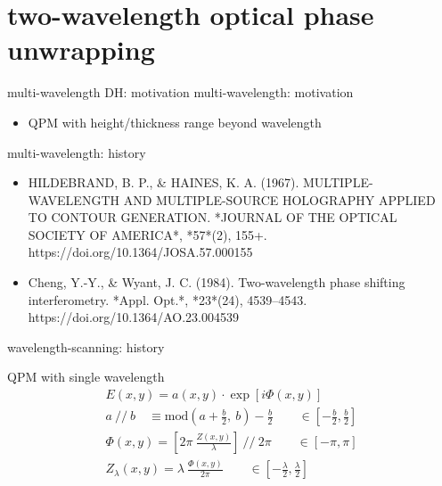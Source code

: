 \documentclass[t, aspectratio=169]{beamer}
\begin{document}


\section{two-wavelength optical phase unwrapping}
\begin{frame}[c]
	\centering\LARGE\textbf{\secname}
\end{frame}


\begin{frame}{multi-wavelength DH: motivation}
multi-wavelength: motivation
	\begin{itemize}
		\item QPM with height/thickness range beyond wavelength
	\end{itemize}	
multi-wavelength: history
	\begin{itemize}
		\item HILDEBRAND, B. P., \& HAINES, K. A. (1967). MULTIPLE-WAVELENGTH AND MULTIPLE-SOURCE HOLOGRAPHY APPLIED TO CONTOUR GENERATION. *JOURNAL OF THE OPTICAL SOCIETY OF AMERICA*, *57*(2), 155+. https://doi.org/10.1364/JOSA.57.000155
		\item Cheng, Y.-Y., \& Wyant, J. C. (1984). Two-wavelength phase shifting interferometry. *Appl. Opt.*, *23*(24), 4539–4543. https://doi.org/10.1364/AO.23.004539
	\end{itemize}
wavelength-scanning: history
\end{frame}


\begin{frame}{QPM with single wavelength}
	\begin{gather*}
E(x,y) = a(x,y)\cdot\exp[i\Phi(x,y)] \\
a \ //\ b \quad \equiv \textrm{mod}\left(a+\frac{b}{2},\ b\right)-\frac{b}{2} \qquad \in \left[-\frac{b}{2}, \frac{b}{2}\right]\\
\Phi(x,y) = \left[ 2\pi\ \frac{Z(x,y)}{\lambda} \right] \ //\ 2\pi \qquad \in [-\pi,\pi] \\
Z_\lambda(x,y) = \lambda\ \frac{\Phi(x,y)}{2\pi} \qquad \in \left[-\frac{\lambda}{2}, \frac{\lambda}{2}\right]
	\end{gather*}
\end{frame}
\end{document}
